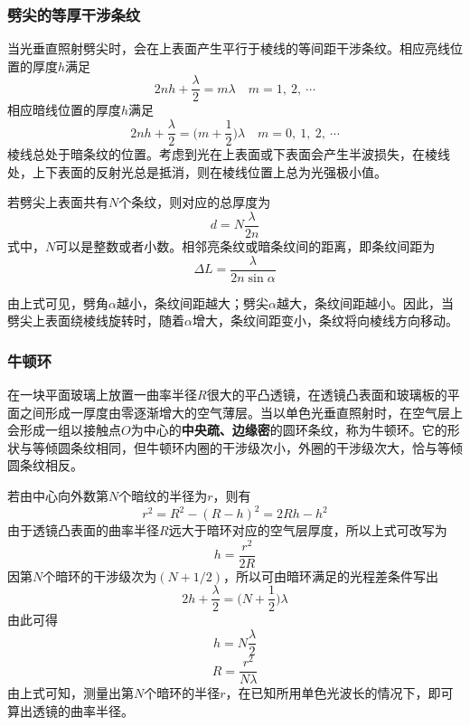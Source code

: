 \documentclass[cn,10pt,chinesefont=founder,math=mtpro2,cite=super,toc=onecol,twoside,openany]{elegantbook}
\begin{document}
\subsubsection{劈尖的等厚干涉条纹}
当光垂直照射劈尖时，会在上表面产生平行于棱线的等间距干涉条纹。相应亮线位置的厚度$h$满足
\begin{equation}
2nh+\frac{\lambda}{2}=m\lambda\quad m=1,\ 2,\ \cdots
\end{equation}
相应暗线位置的厚度$h$满足
\begin{equation}
2nh+\frac{\lambda}{2}=\bigg(m+\frac{1}{2}\bigg)\lambda\quad m=0,\ 1,\ 2,\ \cdots
\end{equation}
棱线总处于暗条纹的位置。考虑到光在上表面或下表面会产生半波损失，在棱线处，上下表面的反射光总是抵消，则在棱线位置上总为光强极小值。

若劈尖上表面共有$N$个条纹，则对应的总厚度为
\begin{equation}
d=N\frac{\lambda}{2n}
\end{equation}
式中，$N$可以是整数或者小数。相邻亮条纹或暗条纹间的距离，即条纹间距为
\begin{equation}
\Delta L=\frac{\lambda}{2n\sin\alpha}
\end{equation}
\begin{conclusion}
由上式可见，劈角$\alpha$越小，条纹间距越大；劈尖$\alpha$越大，条纹间距越小。因此，当劈尖上表面绕棱线旋转时，随着$\alpha$增大，条纹间距变小，条纹将向棱线方向移动。
\end{conclusion}

\subsubsection{牛顿环}

在一块平面玻璃上放置一曲率半径$R$很大的平凸透镜，在透镜凸表面和玻璃板的平面之间形成一厚度由零逐渐增大的空气薄层。当以单色光垂直照射时，在空气层上会形成一组以接触点$O$为中心的\textbf{中央疏、边缘密}的圆环条纹，称为牛顿环。它的形状与等倾圆条纹相同，但牛顿环内圈的干涉级次小，外圈的干涉级次大，恰与等倾圆条纹相反。

若由中心向外数第$N$个暗纹的半径为$r$，则有
\begin{equation}
r^2=R^2-(R-h)^2=2Rh-h^2
\end{equation}
由于透镜凸表面的曲率半径$R$远大于暗环对应的空气层厚度，所以上式可改写为
\begin{equation}
h=\frac{r^2}{2R}
\end{equation}
因第$N$个暗环的干涉级次为$(N+1/2)$，所以可由暗环满足的光程差条件写出
\begin{equation}
2h+\frac{\lambda}{2}=\bigg(N+\frac{1}{2}\bigg)\lambda
\end{equation}
由此可得
\begin{equation}
h=N\frac{\lambda}{2}
\end{equation}
\begin{equation}
R=\frac{r^2}{N\lambda}
\end{equation}
由上式可知，测量出第$N$个暗环的半径$r$，在已知所用单色光波长的情况下，即可算出透镜的曲率半径。
\end{document}
